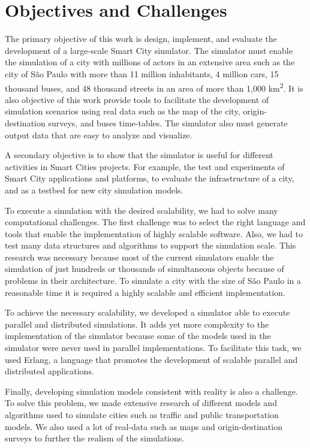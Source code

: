 \section{Objectives and Challenges}
\label{sec:consideracoes_preliminares}

The primary objective of this work is design, implement, and evaluate the development of a large-scale Smart City simulator. The simulator must enable the simulation of a city with millions of actors in an extensive area such as the city of S\~ao Paulo with more than 11 million inhabitants, 4 million cars, 15 thousand buses, and 48 thousand streets in an area of more than 1,000 km\textsuperscript{2}. It is also objective of this work provide tools to facilitate the development of simulation scenarios using real data such as the map of the city, origin-destination surveys, and buses time-tables. The simulator also must generate output data that are easy to analyze and visualize.

A secondary objective is to show that the simulator is useful for different activities in Smart Cities projects. For example, the test and experiments of Smart City applications and platforms, to evaluate the infrastructure of a city, and as a testbed for new city simulation models.

To execute a simulation with the desired scalability, we had to solve many computational challenges. The first challenge was to select the right language and tools that enable the implementation of highly scalable software. Also, we had to test many data structures and algorithms to support the simulation scale. This research was necessary because most of the current simulators enable the simulation of just hundreds or thousands of simultaneous objects because of problems in their architecture. To simulate a city with the size of S\~ao Paulo in a reasonable time it is required a highly scalable and efficient implementation.

To achieve the necessary scalability, we developed a simulator able to execute parallel and distributed simulations. It adds yet more complexity to the implementation of the simulator because some of the models used in the simulator were never used in parallel implementations. To facilitate this task, we used Erlang, a language that promotes the development of scalable parallel and distributed applications. 

Finally, developing simulation models consistent with reality is also a challenge. To solve this problem, we made extensive research of different models and algorithms used to simulate cities such as traffic and public transportation models. We also used a lot of real-data such as maps and origin-destination surveys to further the realism of the simulations.

